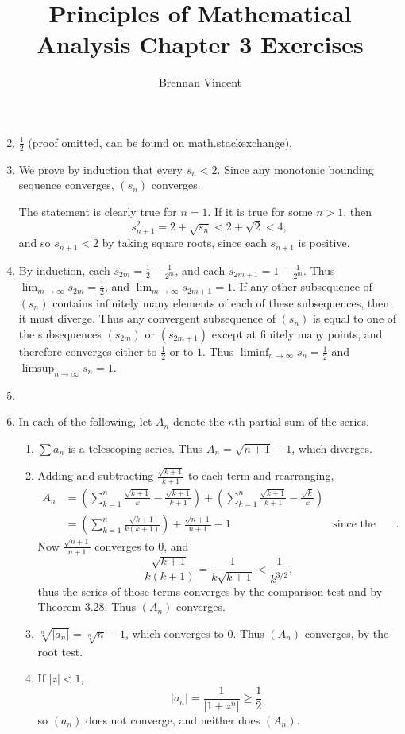 \documentclass{article}
\title{Principles of Mathematical Analysis Chapter 3 Exercises}
\author{Brennan Vincent}
\newcommand{\li}[2][n] {
  \liminf_{#1\to\infty} #2 
}
\newcommand{\ls}[2][n] {
  \limsup_{#1\to\infty} #2
}
\begin{document}
\maketitle
\begin{enumerate}[label=\textbf{\arabic*.}]
\setcounter{enumi}{1}
\item $\frac{1}{2}$ (proof omitted, can be found on math.stackexchange).
\item We prove by induction that every $s_n < 2$. Since any monotonic bounding sequence converges, $(s_n)$ converges.

The statement is clearly true for $n=1$. If it is true for some $n > 1$, then \[s_{n+1}^2 = 2+\sqrt{s_n} < 2 + \sqrt{2} < 4,\] and so $s_{n+1} < 2$ by taking square roots, since each $s_{n+1}$ is positive.
\item By induction, each $s_{2m} = \frac{1}{2} - \frac{1}{2^m}$, and each $s_{2m+1} = 1 - \frac{1}{2^m}$. Thus $\lim_{m\to\infty} s_{2m} = \frac{1}{2}$, and $\lim_{m\to\infty} s_{2m+1} = 1$. If any other subsequence of $(s_n)$ contains infinitely many elements of each of these subsequences, then it must diverge. Thus any convergent subsequence of $(s_n)$ is equal to one of the subsequences $(s_{2m})$ or $(s_{2m+1})$ except at finitely many points, and therefore converges either to $\frac{1}{2}$ or to $1$. Thus $\li s_n = \frac{1}{2}$ and $\ls s_n = 1$.
\item
\item In each of the following, let $A_n$ denote the $n$th partial sum of the series.
\begin{enumerate}
\item $\sum a_n$ is a telescoping series. Thus $A_n = \sqrt{n+1} - 1$, which diverges.
\item Adding and subtracting $\frac{\sqrt{k+1}}{k+1}$ to each term and rearranging,
\begin{align*}
A_n &= \left(\sum_{k=1}^n \frac{\sqrt{k+1}}{k} - \frac{\sqrt{k+1}}{k+1}\right) + \left(\sum_{k=1}^n \frac{\sqrt{k+1}}{k+1} - \frac{\sqrt k}{k}\right)\\
&= \left(\sum_{k=1}^n\frac{\sqrt{k+1}}{k(k+1)}\right) + \frac{\sqrt{n+1}}{n+1} - 1&\text{since the second sum above is telescoping}.
\end{align*}
Now $\frac{\sqrt{n+1}}{n+1}$ converges to $0$, and \[\frac{\sqrt{k+1}}{k(k+1)} = \frac{1}{k\sqrt{k+1}} < \frac{1}{k^{3/2}},\] thus the series of those terms converges by the comparison test and by Theorem 3.28. Thus $(A_n)$ converges.
\item $\sqrt[n]{|a_n|} = \sqrt[n]{n} - 1$, which converges to $0$. Thus $(A_n)$ converges, by the root test.
\item
If $|z| < 1$, \[|a_n| = \frac{1}{|1+z^n|} \geq \frac{1}{2},\] so $(a_n)$ does not converge, and neither does $(A_n)$.


\end{enumerate}
\end{enumerate}
\end{document}
